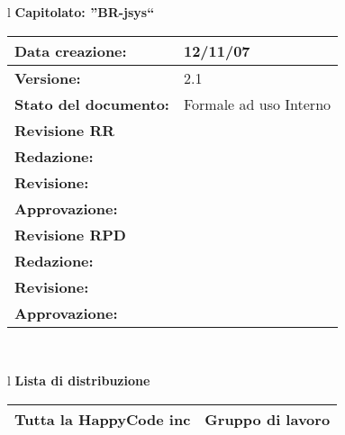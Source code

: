 

\newcommand{\lv}{ 2.1 } %
\newcommand{\dt}{ Norme Di Progetto }%



\begin{center}
\thispagestyle{plain}
\begin{table}[htbp]
\large{
\begin{tabular}{l}
\Large{\textbf{\textsf{Capitolato: ''BR-jsys``}}} \\
\begin{tabular}{|p{6cm}|p{6cm}|}
\hline
\textbf{Data creazione:} & 12/11/07 \\
\hline
\textbf{Versione:} & \lv \\ \hline
\textbf{Stato del documento:} & Formale ad uso Interno \\ \hline
\textbf{Revisione RR} &      \\ \hline
\textbf{Redazione:} & \FC \\ \hline
\textbf{Revisione:} & \MT \\ \hline
\textbf{Approvazione:}  & \ET \\ \hline
\textbf{Revisione RPD} & \\ \hline
\textbf{Redazione:} & \ET \\ \hline
\textbf{Revisione:} & \FC \\ \hline
\textbf{Approvazione:} & \MM \\ \hline
\end{tabular} \\
\end{tabular}
}
\end{table}

\begin{table}[hbtp]
\large{
\begin{tabular}{l}
\Large{\textbf{\textsf{Lista di distribuzione}}} \\
\begin{tabular}{|p{6cm}|p{6cm}|} \hline
{Tutta la HappyCode inc}& Gruppo di lavoro \\ \hline
\end{tabular} \\
\end{tabular}
}
\end{table}


\end{center}
